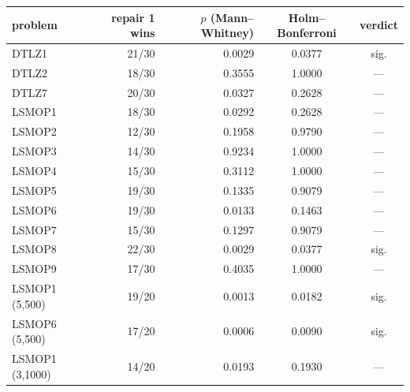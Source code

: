 \footnotesize
\setlength{\tabcolsep}{5pt}
\begin{tabular}{lrrcc}
\toprule
problem & repair 1 wins & $p$ (Mann--Whitney) & Holm--Bonferroni & verdict \\
\midrule
DTLZ1 & 21/30 & 0.0029 & 0.0377 & sig. \\
DTLZ2 & 18/30 & 0.3555 & 1.0000 & --- \\
DTLZ7 & 20/30 & 0.0327 & 0.2628 & --- \\
LSMOP1 & 18/30 & 0.0292 & 0.2628 & --- \\
LSMOP2 & 12/30 & 0.1958 & 0.9790 & --- \\
LSMOP3 & 14/30 & 0.9234 & 1.0000 & --- \\
LSMOP4 & 15/30 & 0.3112 & 1.0000 & --- \\
LSMOP5 & 19/30 & 0.1335 & 0.9079 & --- \\
LSMOP6 & 19/30 & 0.0133 & 0.1463 & --- \\
LSMOP7 & 15/30 & 0.1297 & 0.9079 & --- \\
LSMOP8 & 22/30 & 0.0029 & 0.0377 & sig. \\
LSMOP9 & 17/30 & 0.4035 & 1.0000 & --- \\
LSMOP1 (5,500) & 19/20 & 0.0013 & 0.0182 & sig. \\
LSMOP6 (5,500) & 17/20 & 0.0006 & 0.0090 & sig. \\
LSMOP1 (3,1000) & 14/20 & 0.0193 & 0.1930 & --- \\
\bottomrule
\end{tabular}
